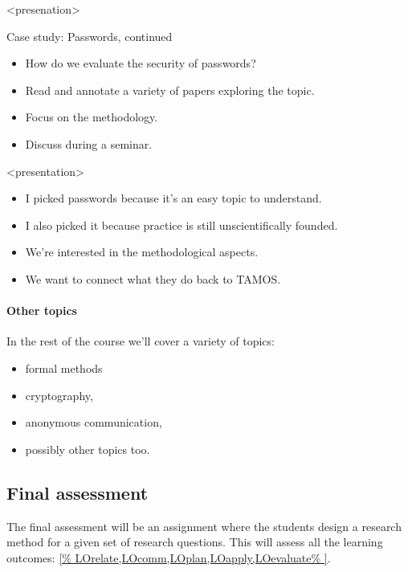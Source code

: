 \begin{frame}<presenation>
  \begin{block}{Case study: Passwords, continued}
    \begin{itemize}
      \item How do we evaluate the security of passwords?
      \item Read and annotate a variety of papers exploring the topic.
      \item Focus on the methodology.
      \item Discuss during a seminar.
    \end{itemize}
  \end{block}
\end{frame}

\begin{frame}<presentation>
  \begin{remark}
    \begin{itemize}
      \item I picked passwords because it's an easy topic to understand.
      \item I also picked it because practice is still unscientifically 
        founded.
      \item We're interested in the methodological aspects.
      \item We want to connect what they do back to TAMOS.
    \end{itemize}
  \end{remark}
\end{frame}

\paragraph{Other topics}

In the rest of the course we'll cover a variety of topics:
\begin{itemize}
  \item formal methods
  \item cryptography,
  \item anonymous communication,
  \item possibly other topics too.
\end{itemize}

\subsection{Final assessment}

The final assessment will be an assignment where the students design a research 
method for a given set of research questions.
This will assess all the learning outcomes: \cref{%
  LOrelate,LOcomm,LOplan,LOapply,LOevaluate%
}.

